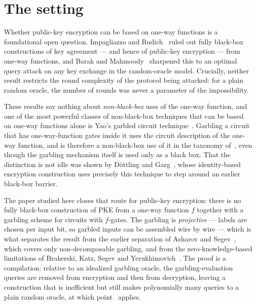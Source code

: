\documentclass{aicr-conjecture}
\begin{document}
\section{The setting}\label{sec:setting}

Whether public-key encryption can be based on one-way functions is a
foundational open question. Impagliazzo and Rudich~\cite{IR89} ruled out
fully black-box constructions of key agreement --- and hence of public-key
encryption --- from one-way functions, and Barak and
Mahmoody~\cite{BMG09} sharpened this to an optimal query attack on any key
exchange in the random-oracle model. Crucially, neither result restricts
the round complexity of the protocol being attacked: for a plain random
oracle, the number of rounds was never a parameter of the impossibility.

These results say nothing about \emph{non-black-box} uses of the one-way
function, and one of the most powerful classes of non-black-box techniques
that can be based on one-way functions alone is Yao's garbled circuit
technique~\cite{Yao86,BHR12}. Garbling a circuit that has one-way-function
gates inside it uses the circuit description of the one-way function, and
is therefore a non-black-box use of it in the taxonomy of~\cite{RTV04},
even though the garbling mechanism itself is used only as a black box.
That the distinction is not idle was shown by D\"ottling and
Garg~\cite{DG17}, whose identity-based encryption construction uses
precisely this technique to step around an earlier black-box barrier.

The paper studied here closes that route for public-key encryption: there
is no fully black-box construction of PKE from a one-way function $f$
together with a garbling scheme for circuits with $f$-gates. The garbling
is \emph{projective} --- labels are chosen per input bit, so garbled
inputs can be assembled wire by wire --- which is what separates the
result from the earlier separation of Asharov and Segev~\cite{AS15}, which
covers only non-decomposable garbling, and from the zero-knowledge-based
limitations of Brakerski, Katz, Segev and Yerukhimovich~\cite{BKSY11}. The
proof is a compilation: relative to an idealized garbling oracle, the
garbling-evaluation queries are removed from encryption and then from
decryption, leaving a construction that is inefficient but still makes
polynomially many queries to a plain random oracle, at which
point~\cite{IR89} applies.
\end{document}
